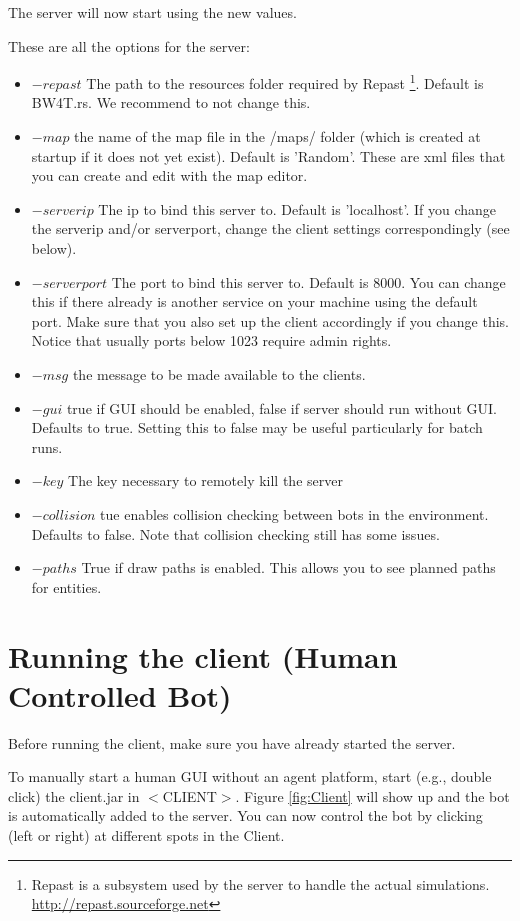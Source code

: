 \documentclass[11pt,a4paper]{article}
\begin{document}
The server will now start using the new values.

These are all the  options for the server:
\begin{itemize}
\item $-repast$ The path to the resources folder required by Repast \footnote{Repast is a subsystem used by the server to handle the actual simulations. \url{http://repast.sourceforge.net} }. Default is BW4T.rs. We recommend to not change this.  
\item $-map$ the name of the map file in the /maps/ folder (which is created at startup if it does not yet exist). Default is 'Random'. These are xml files that you can create and edit with the map editor.
\item $-serverip$ The ip to bind this server to. Default is 'localhost'. If you change the serverip and/or serverport, change the client settings correspondingly (see below). 
\item $-serverport$  The port to bind this server to. Default is 8000. You can change this if there already is another service on your machine using the default port. Make sure that you also set up the client accordingly if you change this. Notice that usually ports below 1023 require admin rights.
\item $-msg$ the message to be made available to the clients.
\item $-gui$ true if GUI should be enabled, false if server should run without GUI. Defaults to true. Setting this to false  may be useful particularly for batch runs.
\item $-key$ The key necessary to remotely kill the server
\item $-collision$ tue enables collision checking between bots in the environment. Defaults to false. Note that collision checking still has some issues.
\item $-paths$ True if draw paths is enabled. This allows you to see planned paths for entities.
\end{itemize}

\section{Running the client (Human Controlled Bot)}
Before running the client, make sure you have already started the server. 

To manually start a human GUI without an agent platform, start (e.g., double click) the client.jar in $<$CLIENT$>$. Figure \ref{fig:Client} will show up and the bot is automatically added to the server. You can now control the bot by clicking (left or right) at different spots in the Client. 
\end{document}

